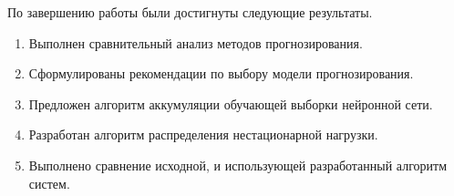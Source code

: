 По завершению работы были достигнуты следующие результаты.
\begin{enumerate}
	\item Выполнен сравнительный анализ методов прогнозирования.
	\item Сформулированы рекомендации по выбору модели прогнозирования.
	\item Предложен алгоритм аккумуляции обучающей выборки нейронной 
		сети.
	\item Разработан алгоритм распределения нестационарной нагрузки.
	\item Выполнено сравнение исходной, и использующей разработанный 
		алгоритм систем.
\end{enumerate}
